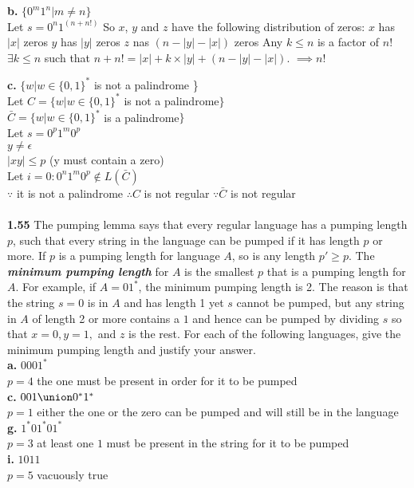 \documentclass{article}
\begin{document}
{\bf b.} $\{0^{m}1^{n} | m \neq n\}$\\
\subitem Let $s = 0^n1^{(n+n!)}$
\subitem So $x$, $y$ and $z$ have the following distribution of zeros:
	\subsubitem $x$ has $|x|$ zeros
	\subsubitem $y$ has $|y|$ zeros
	\subsubitem $z$ nas $(n - |y| - |x|)$ zeros
\subitem Any $k \le n$ is a factor of $n!$
\subitem $\exists k \le n$ such that $n + n! = |x| + k \times |y| + (n - |y| - |x|)$.
\subitem $\implies n! $ 



{\bf c.} $\{w | w \in \{0,1\}^{*} $ is not a palindrome \} \\
\subitem
Let $C = \{w | w \in \{0,1\}^{*} $ is not a palindrome$ \}$\\
$\bar{C} = \{w | w \in \{0,1\}^{*} $ is a palindrome$ \}$\\
Let $s = 0^{p}1^{m}0^{p}$\\
$y \neq \epsilon$\\
$|xy| \leq p$ (y must contain a zero)\\
Let $i = 0 : 0^{n}1^{m}0^{p} \notin L(\bar{C})$\\
$\because$ it is not a palindrome
$\therefore C$ is not regular
$\because \bar{C}$ is not regular\\
\\

{\bf 1.55} The pumping lemma says that every regular language has a pumping length $p$, such that every string in the language can be pumped if it has length $p$ or more. If $p$ is a pumping length for language $A$, so is any length $p' \geq p$. The {\bf {\em minimum pumping length}} for $A$ is the smallest $p$ that is a pumping length for $A$. For example, if $A = 01^{*}$, the minimum pumping length is 2. The reason is that the string $s=0$ is in $A$ and has length 1 yet $s$ cannot be pumped, but any string in $A$ of length 2 or more contains a $1$ and hence can be pumped by dividing $s$ so that $x=0, y = 1,$ and $z$ is the rest. For each of the following languages, give the minimum pumping length and justify your answer.
\\{\bf a.} $0001^{*}$
\\$p=4$ the one must be present in order for it to be pumped
\\{\bf c.} $001 \union 0^{*}1^{*}$
\\$p=1$ either the one or the zero can be pumped and will still be in the language
\\{\bf g.} $1^{*}01^{*}01^{*}$
\\$p=3$ at least one $1$ must be present in the string for it to be pumped
\\{\bf i.} $1011$
\\$p=5$ vacuously true
\end{document}
